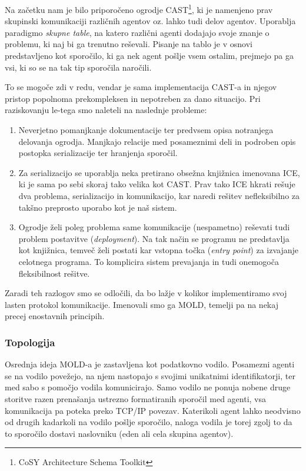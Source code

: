 \documentclass[a4paper,10pt]{article}
\begin{document}
Na začetku nam je bilo priporočeno ogrodje CAST\footnote{CoSY Architecture Schema Toolkit}, ki je namenjeno prav skupinski komunikaciji različnih agentov oz. lahko tudi delov agentov. Uporablja paradigmo \textit{skupne table}, na katero različni agenti dodajajo svoje znanje o problemu, ki naj bi ga trenutno reševali. Pisanje na tablo je v osnovi predstavljeno kot sporočilo, ki ga nek agent pošlje vsem ostalim, prejmejo pa ga vsi, ki so se na tak tip sporočila naročili.

To se mogoče zdi v redu, vendar je sama implementacija CAST-a in njegov pristop popolnoma prekompleksen in nepotreben za dano situacijo. Pri raziskovanju le-tega smo naleteli na naslednje probleme:
\begin{enumerate}
  \item Neverjetno pomanjkanje dokumentacije ter predvsem opisa notranjega delovanja ogrodja. Manjkajo relacije med posameznimi deli in podroben opis postopka serializacije ter hranjenja sporočil.
  
  \item Za serializacijo se uporablja neka pretirano obsežna knjižnica imenovana ICE, ki je sama po sebi skoraj tako velika kot CAST. Prav tako ICE hkrati rešuje dva problema, serializacijo in komunikacijo, kar naredi rešitev nefleksibilno za takšno preprosto uporabo kot je naš sistem.
  
  \item Ogrodje želi poleg problema same komunikacije (nespametno) reševati tudi problem postavitve (\textit{deployment}). Na tak način se programu ne predstavlja kot knjižnica, temveč želi postati kar vstopna točka (\textit{entry point}) za izvajanje celotnega programa. To komplicira sistem prevajanja in tudi onemogoča fleksibilnost rešitve.
\end{enumerate}

Zaradi teh razlogov smo se odločili, da bo lažje v kolikor implementiramo svoj lasten protokol komunikacije. Imenovali smo ga MOLD, temelji pa na nekaj precej enostavnih principih.

\subsubsection{Topologija}

Osrednja ideja MOLD-a je zastavljena kot podatkovno vodilo. Posamezni agenti se na vodilo povežejo, na njem nastopajo s svojimi unikatnimi identifikatorji, ter med sabo s pomočjo vodila komunicirajo. Samo vodilo ne ponuja nobene druge storitve razen prenašanja ustrezno formatiranih sporočil med agenti, vsa komunikacija pa poteka preko TCP/IP povezav. Katerikoli agent lahko neodvisno od drugih kadarkoli na vodilo pošlje sporočilo, naloga vodila je torej zgolj to da to sporočilo dostavi naslovniku (eden ali cela skupina agentov).
\end{document}
